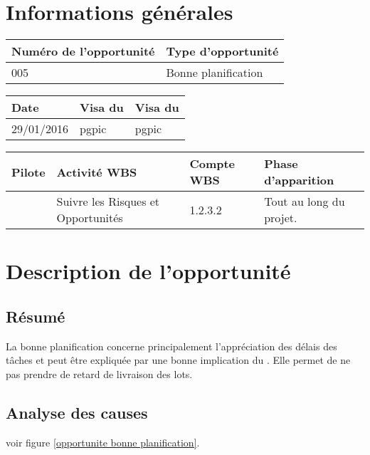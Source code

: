 
\section*{Informations générales}
 
\begin{table}[h]
\centering
	\begin{tabularx}{16.8cm}{|X|X|}
	\hline
	\rowcolor{gray!40} Numéro de l'opportunité & Type d'opportunité \\
	\hline
	005 & Bonne planification \\
	\hline
	\end{tabularx}
\end{table}

\begin{table}[h]
\centering
	\begin{tabularx}{16.8cm}{|X|X|X|}
	\hline
	\rowcolor{gray!40} Date & Visa du \RQ & Visa du \CP \\
	\hline
	 29/01/2016 & pgpic & pgpic \\
	\hline
	\end{tabularx}
\end{table}

\begin{table}[h]
\centering
	\begin{tabularx}{16.8cm}{|X|X|X|X|}
	\hline
	\rowcolor{gray!40} Pilote & Activité WBS & Compte WBS & Phase d'apparition \\
	\hline
	 \Sergi & Suivre les Risques et Opportunités & 1.2.3.2 & Tout au long du projet.\\
	\hline
	\end{tabularx}
\end{table}

\section*{Description de l'opportunité}

\subsection*{Résumé}

	La bonne planification concerne principalement l’appréciation des délais des tâches
et peut être expliquée par une bonne implication du \CP. Elle permet de ne pas prendre de retard de
livraison des lots.
	
\subsection*{Analyse des causes}
	voir figure \ref{opportunite bonne planification}.

